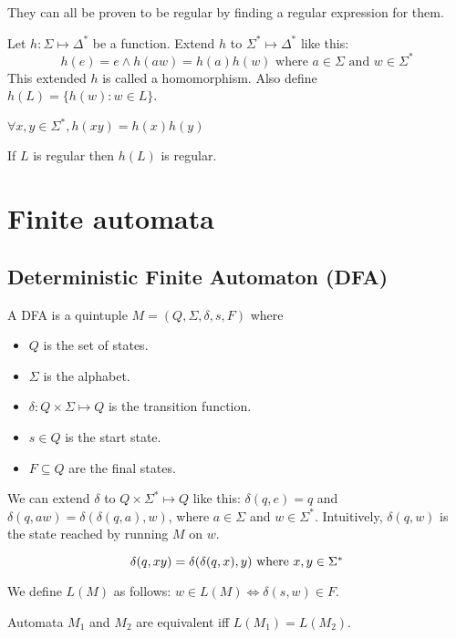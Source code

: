 They can all be proven to be regular by finding a regular expression for them.

Let $h: \Sigma \mapsto \Delta^*$ be a function.
Extend $h$ to $\Sigma^* \mapsto \Delta^*$ like this:
\[ h(e) = e \wedge h(aw) = h(a)h(w) \textrm{ where } a \in \Sigma \textrm{ and } w \in \Sigma^* \]
This extended $h$ is called a homomorphism. Also define $h(L) = \{h(w): w \in L\}$.

\begin{theorem}$\forall x, y \in \Sigma^*, h(xy) = h(x)h(y)$\end{theorem}
\begin{theorem}If $L$ is regular then $h(L)$ is regular.\end{theorem}

\section{Finite automata}

\subsection[DFA]{Deterministic Finite Automaton (DFA)}

A DFA is a quintuple $M = (Q, \Sigma, \delta, s, F)$ where

\begin{itemize}
\item $Q$ is the set of states.
\item $\Sigma$ is the alphabet.
\item $\delta: Q \times \Sigma \mapsto Q$ is the transition function.
\item $s \in Q$ is the start state.
\item $F \subseteq Q$ are the final states.
\end{itemize}

We can extend $\delta$ to $Q \times \Sigma^* \mapsto Q$ like this:
$\delta(q, e) = q$ and $\delta(q, aw) = \delta(\delta(q, a), w)$,
where $a \in \Sigma$ and $w \in \Sigma^*$.
Intuitively, $\delta(q, w)$ is the state reached by running $M$ on $w$.

\begin{theorem}
\[ \delta(q, xy) = \delta(\delta(q, x), y)$ where $x, y \in \Sigma^* \]
\end{theorem}

We define $L(M)$ as follows:
$ w \in L(M) \iff \delta(s, w) \in F$.

Automata $M_1$ and $M_2$ are equivalent iff $L(M_1) = L(M_2)$.


